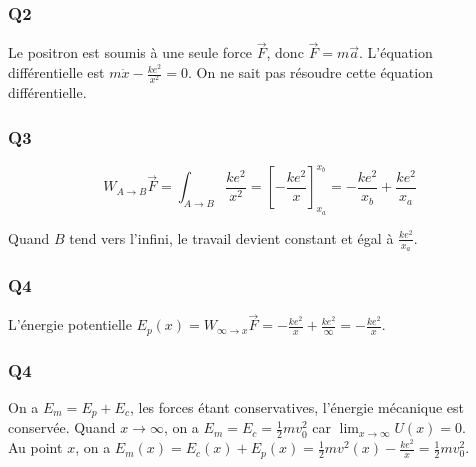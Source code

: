 \documentclass[]{book}
\theoremstyle{definition}
\begin{document}
\subsubsection{Q2}
Le positron est soumis \`a une seule force $\overrightarrow{F}$, donc $\overrightarrow{F} = m\overrightarrow{a}$. L'\'equation diff\'erentielle est $m\ddot{x} - \frac{ke^2}{x^2} = 0$. On ne sait pas r\'esoudre cette \'equation diff\'erentielle.

\subsubsection{Q3}
$$W_{A \to B}\overrightarrow{F} = \int_{A \to B} \frac{ke^2}{x^2} = [-\frac{ke^2}{x}]_{x_a}^{x_b} = -\frac{ke^2}{x_b} + \frac{ke^2}{x_a}$$

Quand $B$ tend vers l'infini, le travail devient constant et \'egal \`a $\frac{ke^2}{x_a}$.

\subsubsection{Q4}
L'\'energie potentielle $E_p(x) = W_{\infty \to x}\overrightarrow{F} = -\frac{ke^2}{x} + \frac{ke^2}{\infty} = -\frac{ke^2}{x}$.\\

\subsubsection{Q4}
On a $E_m = E_p + E_c$, les forces \'etant conservatives, l'\'energie m\'ecanique est conserv\'ee. Quand $x \to \infty$, on a $E_m = E_c = \frac{1}{2}mv_0^2$ car $\lim_{x \to \infty}U(x) = 0$.\\
Au point $x$, on a $E_m(x) = E_c(x) + E_p(x) = \frac{1}{2}mv^2(x) - \frac{ke^2}{x} = \frac{1}{2}mv_0^2$. 
 
\end{document}
